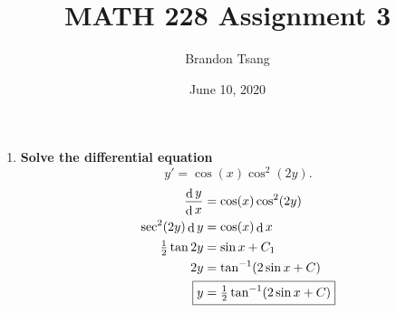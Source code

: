 \documentclass[11pt]{article}
\title{MATH 228 Assignment 3}
\author{Brandon Tsang}
\date{June 10, 2020}
\DeclareMathOperator{\diff}{d}
\newcommand\dd[2]{\frac{\diff #1}{\diff #2}}
\begin{document}
    \maketitle
    \begin{enumerate}[label=\textbf{\arabic*.}, start=3]
        \item{
            \textbf{\boldmath Solve the differential equation \[y'=\cos(x)\cos^2(2y).\]}
            \vspace*{-24pt}
            \begin{align*}
                \dd{y}{x}&=\cos(x)\cos^2(2y) \\
                \sec^2(2y)\diff y&=\cos(x)\diff x \\
                \tfrac{1}{2}\tan 2y&=\sin x+C_1 \\
                2y&=\tan^{-1}(2\sin x+C) \\
                \Aboxed{y&=\tfrac{1}{2}\tan^{-1}(2\sin x+C)}
            \end{align*}
        }
    \end{enumerate}
\end{document}
